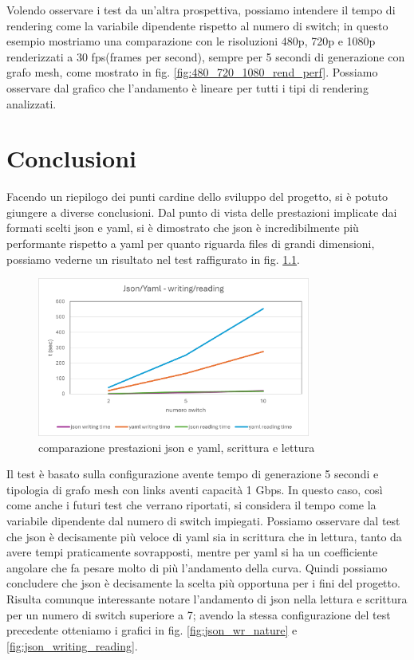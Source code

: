 \documentclass[binding=0.6cm]{sapthesis}
\begin{document}
Volendo osservare i test da un'altra prospettiva, possiamo intendere il tempo di rendering come la variabile dipendente rispetto al numero di switch; in questo
esempio mostriamo una comparazione con le risoluzioni 480p, 720p e 1080p renderizzati a 30 fps(frames per second),
 sempre per 5 secondi di generazione con grafo mesh, come mostrato in fig. \ref{fig:480_720_1080_rend_perf}. Possiamo osservare dal grafico che l'andamento è lineare per tutti i tipi di rendering analizzati.

\chapter{Conclusioni}
Facendo un riepilogo dei punti cardine dello sviluppo del progetto, si è potuto giungere a diverse conclusioni. Dal punto di vista delle prestazioni implicate
dai formati scelti json e yaml, si è dimostrato che json è incredibilmente più performante rispetto a yaml per quanto riguarda files di grandi dimensioni, possiamo vederne un risultato nel test raffigurato in fig. \ref{fig:json_yaml_wr_comparison}.

\begin{figure}[h]
    \centering
    \includegraphics[width=0.8\textwidth]{immagini/json_yaml_wr_comparison.png}
    \caption{comparazione prestazioni json e yaml, scrittura e lettura}
    \label{fig:json_yaml_wr_comparison}
\end{figure}

Il test è basato sulla configurazione avente tempo di generazione 5 secondi e tipologia di grafo mesh con links aventi capacità 1 Gbps.
In questo caso, così come anche i futuri test che verrano riportati, si considera il tempo come la variabile dipendente dal numero di switch impiegati.
Possiamo osservare dal test che json è decisamente più veloce di yaml sia in scrittura che in lettura, tanto da avere tempi praticamente sovrapposti, mentre per yaml si ha un coefficiente angolare che fa pesare molto di più l'andamento della curva. Quindi possiamo concludere che json è decisamente la scelta più opportuna 
per i fini del progetto. Risulta comunque interessante notare l'andamento di json nella lettura e scrittura per un numero di switch superiore a 7; avendo la stessa configurazione del test precedente otteniamo i grafici in fig. \ref{fig:json_wr_nature} e \ref{fig:json_writing_reading}.
\end{document}
